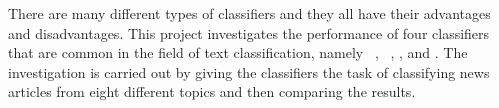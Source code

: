 There are many different types of classifiers and they all have their advantages and disadvantages. This project investigates the performance of four classifiers that are common in the field of text classification, namely \bn\ \nb, \mn\ \nb, \rf, and \svm. The investigation is carried out by giving the classifiers the task of classifying news articles from eight different topics and then comparing the results.